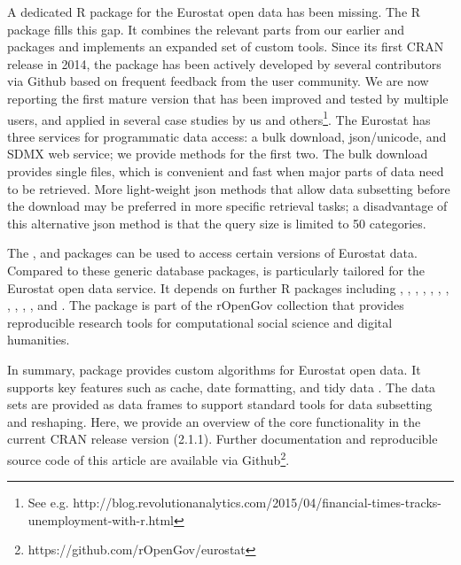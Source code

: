 A dedicated R package for the Eurostat open data has been
missing. The  R package fills this gap. It combines the relevant parts from our earlier  \citep{statfi}
and  
\citep{smarterpoland} packages and implements an expanded set of custom tools.
Since its first CRAN release in 2014, the  package
has been actively developed by several contributors via Github based
on frequent feedback from the user community. We are now reporting the
first mature version that has been improved and tested by multiple
users, and applied in several case studies by us and
others\footnote{See
e.g. http://blog.revolutionanalytics.com/2015/04/financial-times-tracks-unemployment-with-r.html}. The
Eurostat has three services for programmatic data access: a bulk
download, json/unicode, and SDMX web service; we provide methods for
the first two. The bulk download provides single files, which is
convenient and fast when major parts of data need to be
retrieved. More light-weight json methods that allow data subsetting
before the download may be preferred in more specific retrieval tasks;
a disadvantage of this alternative json method is that the query size
is limited to 50 categories.

The  \citep{datamart},  \citep{quandl} and
 \citep{pdfetch} 
packages can be used to access certain versions of Eurostat
data. Compared to these generic database packages, 
is particularly tailored for the Eurostat open data service. It
depends on further R packages including
 \citep{classInt},
 \citep{dplyr},
 \citep{httr},
 \citep{jsonlite},
 \citep{knitr},
 \citep{ggplot2},
 \citep{mapproj}, 
 \citep{RColorBrewer},
 \citep{readr},
 \citep{sp},
 \citep{stringi}, and
 \citep{stringr}. The  package is part of the rOpenGov collection
\citep{Lahti13icml} that provides reproducible research tools for
computational social science and digital humanities.

In summary,  package provides custom algorithms for
Eurostat open data. It supports key features such as cache, date
formatting, and tidy data \citep{wickham2014}. The data sets are
provided as  data frames \citep{tibble} to support
standard tools for data subsetting and reshaping.  Here, we provide an
overview of the core functionality in the current CRAN release version
(2.1.1). Further documentation and reproducible source code of this
article are available via
Github\footnote{https://github.com/rOpenGov/eurostat}.


